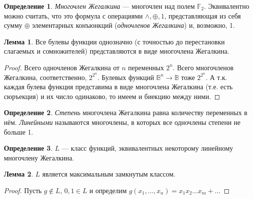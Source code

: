 \documentclass[12pt]{article}
\let\la\land
\let\nin\notin
\theoremstyle{definition}
\newtheorem{definition}{Определение}[section]
\theoremstyle{statement}
\theoremstyle{theorem}
\newtheorem{lemma}{Лемма}[section]
\begin{document}
\begin{definition}
  \textit{Многочлен Жегалкина} --- многочлен над полем
  $\mathbb{F}_2$. Эквивалентно можно считать, что это формула с
  операциями $\la, \oplus, 1$, представляющая из себя сумму $\oplus$
  элементарных конъюнкций (\textit{одночленов Жегалкина}) и, возможно, 1.
\end{definition}

\begin{lemma}
  Все булевы функции однозначно (с точностью до перестановки
  слагаемых и сомножителей) представляются в виде многочлена Жегалкина.
  \begin{proof}
    Всего одночленов Жегалкина от $n$ переменных $2^n$. Всего
    многочленов Жегалкина, соответственно, $2^{2^n}$. Булевых функций
    $\mathbb{B}^n \to \mathbb{B}$ тоже $2^{2^n}$. А т.к. каждая
    булева функция представима в виде многочлена Жегалкина (т.е. есть
    сюръекция) и их число одинаково, то имеем и биекцию между ними.
  \end{proof}
\end{lemma}

\begin{definition}
  \textit{Степень} многочлена Жегалкина равна количеству переменных в
  нём. \textit{Линейными} называются многочлены, в которых все
  одночлены степени не больше 1.
\end{definition}

\begin{definition}
  $L$ --- класс функций, эквивалентных некоторому линейному
  многочлену Жегалкина.
\end{definition}

\begin{lemma}
  $L$ является максимальным замкнутым классом.
  \begin{proof}
    Пусть $g \nin L$, $0, 1 \in L$ и определим $g(x_1, \dots, x_n) =
    x_1x_2\dots x_m + \dots$
  \end{proof}
\end{lemma}
\end{document}
